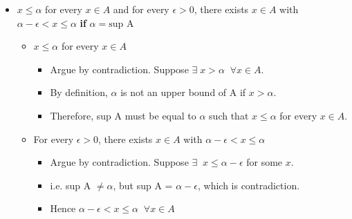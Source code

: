 \documentclass[12pt]{article}
\begin{document}
\begin{itemize}
    \item $x \le \alpha$ for every $x \in A$ and for every $\epsilon > 0$, there exists $x \in A$ with $\alpha - \epsilon < x \le \alpha$ \textbf{if} $\alpha = \text{sup A}$
    \begin{itemize}
        \item $x \le \alpha$ for every $x \in A$
        \begin{itemize}
            \item Argue by contradiction. Suppose $\exists\; x > \alpha \;\;\forall x \in A$.
            \item By definition, $\alpha$ is not an upper bound of A if $x > \alpha$.
            \item Therefore, sup A must be equal to $\alpha$ such that $x \le \alpha$ for every $x \in A$.
        \end{itemize}
    \item For every $\epsilon > 0$, there exists $x \in A$ with $\alpha - \epsilon < x \le \alpha$
        \begin{itemize}
            \item Argue by contradiction. Suppose $\exists \;\; x \le \alpha - \epsilon$ for some $x$.
            \item i.e. sup A $\neq \alpha$, but sup A = $\alpha - \epsilon$, which is contradiction.
            \item Hence $\alpha - \epsilon < x \le \alpha \;\;\forall x \in A$
        \end{itemize}
    \end{itemize}
    

        
\end{itemize}
\end{document}
